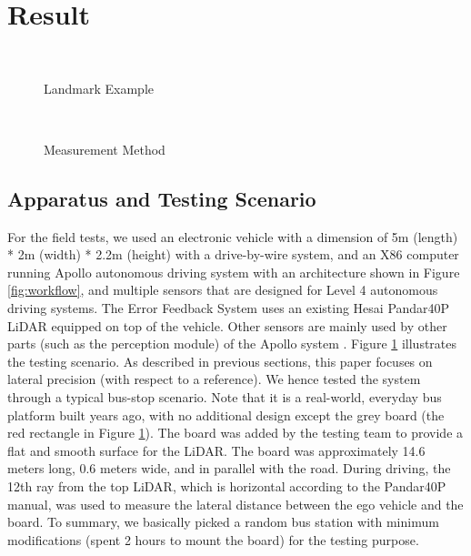 \documentclass[letterpaper, 10 pt, conference]{ieeeconf}
\begin{document}
\section{Result} \label{sec:result}
\begin{figure}[thpb!]
\small
\centering
     \\    
  \caption{Landmark Example}
  \label{fig:landmark1}
  \scriptsize{}
\end{figure}

\begin{figure}[thpb!]
\small
\centering
     \\    
  \caption{Measurement Method}
  \label{fig:measurement}
  \scriptsize{}
\end{figure}

\subsection{Apparatus and Testing Scenario}
For the field tests, we used an electronic vehicle with a dimension of 5m (length) * 2m (width) * 2.2m (height) with a drive-by-wire system, and an X86 computer running Apollo autonomous driving system with an architecture shown in Figure \ref{fig:workflow}, and multiple sensors that are designed for Level 4 autonomous driving systems.
The Error Feedback System uses an existing Hesai Pandar40P LiDAR \cite{Hesai40P} equipped on top of the vehicle. Other sensors are mainly used by other parts (such as the perception module) of the Apollo system \cite{Apollo2017}. 
Figure \ref{fig:landmark1} illustrates the testing scenario. As described in previous sections, this paper focuses on lateral precision (with respect to a reference). We hence tested the system through a typical bus-stop scenario. 
Note that it is a real-world, everyday bus platform built years ago, with no additional design except the grey board (the red rectangle in Figure \ref{fig:landmark1}). 
The board was added by the testing team to provide a flat and smooth surface for the LiDAR. The board was approximately 14.6 meters long, 0.6 meters wide, and in parallel with the road. During driving, the 12th ray from the top LiDAR, which is horizontal according to the Pandar40P manual, was used to measure the lateral distance between the ego vehicle and the board. To summary, we basically picked a random bus station with minimum modifications (spent 2 hours to mount the board) for the testing purpose.
\end{document}

